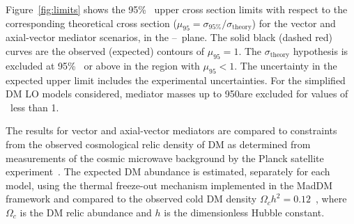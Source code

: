 Figure~\ref{fig:limits} shows the 95\% \CL\ upper cross section limits with respect to the corresponding theoretical cross section ($\mu_{95}= \sigma_{95\%}/\sigma_{\text{theory}}$) for the  vector and axial-vector mediator scenarios, in the \mmed--\mdm\ plane. 
The solid black (dashed red) curves are the observed (expected) contours of $\mu_{95} = 1$. 
The $\sigma_{\text{theory}}$ hypothesis is excluded at 95\% \CL\ or above in the region with $\mu_{95} < 1$. 
The uncertainty in the expected upper limit includes the experimental uncertainties. 
For the simplified DM LO models considered, mediator masses up to 950\GeV are excluded for values of \mdm\ less than 1\GeV.

The results for vector and axial-vector mediators are compared to constraints
from the observed cosmological relic density of DM as determined from measurements of the cosmic microwave background by the Planck satellite experiment~\cite{Ade:2015xua}.
The expected DM abundance is estimated, separately for each model, using the thermal freeze-out mechanism implemented in the {\sc MadDM}~\cite{Backovic:2013dpa} framework and  compared to the observed cold DM density $\Omega_c h^2=0.12$~\cite{Ade:2015xua}, where $\Omega_c$ is the DM relic abundance and $h$ is the dimensionless Hubble constant.

